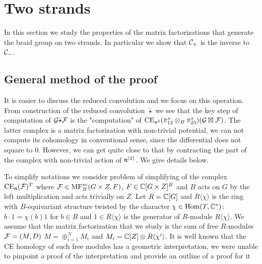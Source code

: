 





\section{Two strands}\label{sec: two str}

In this section we study the properties of the matrix factorizations that generate the braid group on two strands. In particular we show that $\mathcal{C}_+$ is the inverse to $\mathcal{C}_-$.



\subsection{General method of the proof}
It is easier to discuss the reduced convolution and we  focus on this operation.
From construction of the reduced convolution $\bar{\star}$ we see that the key step of computation of  $\mathcal{G}\bar{\star}\mathcal{F}$ is the "computation" of
$\mathrm{CE}_{\mathfrak{n}^{2}}(\bar{\pi}_{12}^*\otimes_B \bar{\pi}_{23}^*)(\mathcal{G}\boxtimes\mathcal{F})$. The latter complex is  a matrix factorization with non-trivial potential,
we can not compute its cohomology in conventional sense, since the differential does not square to $0$. However, we can get quite close to that by contracting
the part of the complex with non-trivial action of $\mathfrak{n}^{(2)}$. We give details below.

To simplify notations we consider problem of simplifying of the complex $\mathrm{CE}_{\mathfrak{n}}(\mathcal{F})^T$ where $\mathcal{F}\in \mathrm{MF}^{sc}_B(G\times Z, F)$, $F\in \mathbb{C}[G\times Z]^B$ and $B$ acts on $G$ by the left multiplication
and acts trivially on $Z$.
Let $R=\mathbb{C}[G]$ and $R\langle \chi\rangle$ is the ring with $B$-equivariant structure twisted by the character $\chi\in \mathop{{\rm Hom}}\nolimits(T,\mathbb{C}^*)$:
$b\cdot 1=\chi(b) 1$ for $b\in B$ and $1\in R\langle\chi\rangle$ is the generator of $R$-module
$R\langle \chi\rangle$.   We assume  that the matrix factorization that we study is the sum of free $R$-modules $\mathcal{F}=(M,D)$
$M=\oplus_{i=1}^N M_i$ and $M_i=\mathbb{C}[Z]\otimes R\langle \chi^i\rangle$. It is well known that the CE homology of such free modules has a geometric interpretation,
we were unable to pinpoint a proof of the interpretation and provide an outline of a  proof for it

